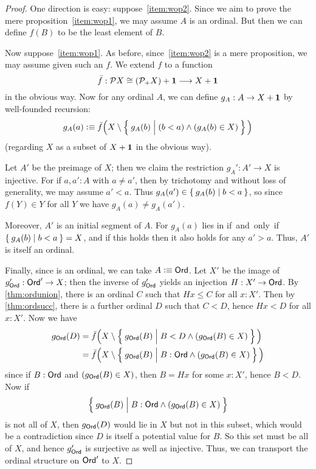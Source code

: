 \begin{proof}
  One direction is easy: suppose~\ref{item:wop2}.
  Since we aim to prove the mere proposition~\ref{item:wop1}, we may assume $A$ is an ordinal.
  But then we can define $f(B)$ to be the least element of $B$.

  Now suppose~\ref{item:wop1}.
  As before, since~\ref{item:wop2} is a mere proposition, we may assume given such an $f$.
  We extend $f$ to a function
  \[ \bar f:\mathcal{P}X \cong (\mathcal{P}_+ X) + \mathbf{1} \longrightarrow X+\mathbf{1}
  \]
  in the obvious way.
  Now for any ordinal $A$, we can define $g_A:A\to X+\mathbf{1}$ by well-founded recursion:
  \[ g_A(a) \defeq 
    \bar f\Big(X \setminus \setof{ g_A(b) | \rule{0pt}{1em} (b<a) \wedge (g_A(b) \in X) }\Big)
  \]
  (regarding $X$ as a subset of $X+\mathbf{1}$ in the obvious way).

  Let $A'$ be the preimage of $X$; then we claim the restriction $g_A':A' \to X$ is injective.
  For if $a,a':A$ with $a\neq a'$, then by trichotomy and without loss of generality, we may assume $a'<a$.
  Thus $g_A(a') \in \Set{ g_A(b) | b<a }$, so since $f(Y)\in Y$ for all $Y$ we have $g_A(a) \neq g_A(a')$.

  Moreover, $A'$ is an initial segment of $A$.
  For $g_A(a)$ lies in \unit if and only if $\Set{g_A(b)|b<a} = X$, and if this holds then it also holds for any $a'>a$.
  Thus, $A'$ is itself an ordinal.

  Finally, since \ord is an ordinal, we can take $A\vcentcolon\equiv\mathsf{Ord}$.
  Let $X'$ be the image of $g_\mathsf{Ord}':\mathsf{Ord}' \to X$; then the inverse of $g_\mathsf{Ord}'$ yields an injection $H:X'\to \mathsf{Ord}$.
  By \autoref{thm:ordunion}, there is an ordinal $C$ such that $Hx\le C$ for all $x:X'$.
  Then by \autoref{thm:ordsucc}, there is a further ordinal $D$ such that $C<D$, hence $Hx<D$ for all $x:X'$.
  Now we have
  \begin{align*}
    g_{\ord}(D) &= \bar f\Big( X \setminus \setof{ g_\ord(B) | \rule{0pt}{1em} B<D \wedge (g_\ord(B) \in X)} \Big)\\
    &=\bar f\Big( X \setminus \setof{ g_\ord(B) | \rule{0pt}{1em} B:\ord \wedge (g_\ord(B) \in X)} \Big)
  \end{align*}
  since if $B:\mathsf{Ord}$ and $(g_\mathsf{Ord}(B) \in X)$, then $B = Hx$ for some $x:X'$, hence $B<D$.
  Now if
  \[\setof{ g_\ord(B) | \rule{0pt}{1em} B:\ord \wedge (g_\ord(B) \in X)}\]
  is not all of $X$, then $g_\mathsf{Ord}(D)$ would lie in $X$ but not in this subset, which would be a contradiction since $D$ is itself a potential value for $B$.
  So this set must be all of $X$, and hence $g_\mathsf{Ord}'$ is surjective as well as injective.
  Thus, we can transport the ordinal structure on $\mathsf{Ord}'$ to $X$.
\end{proof}

